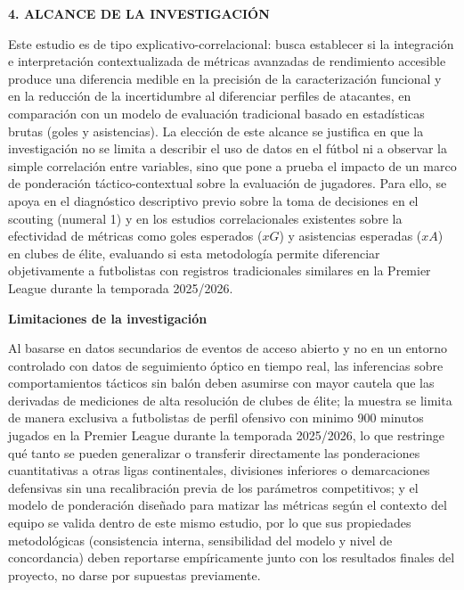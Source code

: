 \begin{center}
    {\Large\bfseries 4. ALCANCE DE LA INVESTIGACIÓN}
\end{center}

Este estudio es de tipo explicativo-correlacional: busca establecer si la integración e interpretación contextualizada de métricas avanzadas de rendimiento accesible produce una diferencia medible en la precisión de la caracterización funcional y en la reducción de la incertidumbre al diferenciar perfiles de atacantes, en comparación con un modelo de evaluación tradicional basado en estadísticas brutas (goles y asistencias). La elección de este alcance se justifica en que la investigación no se limita a describir el uso de datos en el fútbol ni a observar la simple correlación entre variables, sino que pone a prueba el impacto de un marco de ponderación táctico-contextual sobre la evaluación de jugadores. Para ello, se apoya en el diagnóstico descriptivo previo sobre la toma de decisiones en el scouting (numeral 1) y en los estudios correlacionales existentes sobre la efectividad de métricas como goles esperados ($xG$) y asistencias esperadas ($xA$) en clubes de élite, evaluando si esta metodología permite diferenciar objetivamente a futbolistas con registros tradicionales similares en la Premier League durante la temporada 2025/2026.

\textbf{Limitaciones de la investigación}

Al basarse en datos secundarios de eventos de acceso abierto y no en un entorno controlado con datos de seguimiento óptico en tiempo real, las inferencias sobre comportamientos tácticos sin balón deben asumirse con mayor cautela que las derivadas de mediciones de alta resolución de clubes de élite; la muestra se limita de manera exclusiva a futbolistas de perfil ofensivo con minimo 900 minutos jugados en la Premier League durante la temporada 2025/2026, lo que restringe qué tanto se pueden generalizar o transferir directamente las ponderaciones cuantitativas a otras ligas continentales, divisiones inferiores o demarcaciones defensivas sin una recalibración previa de los parámetros competitivos; y el modelo de ponderación diseñado para matizar las métricas según el contexto del equipo se valida dentro de este mismo estudio, por lo que sus propiedades metodológicas (consistencia interna, sensibilidad del modelo y nivel de concordancia) deben reportarse empíricamente junto con los resultados finales del proyecto, no darse por supuestas previamente.

